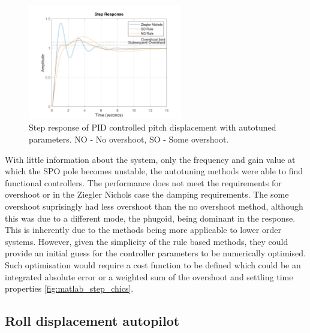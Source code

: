 \documentclass{article}
\begin{document}
\begin{figure}[H]
    \centering
    \includegraphics[width=0.6\textwidth]{figures/pitch_autopilot_autotuning_comparison.png}
    \caption{Step response of PID controlled pitch displacement with autotuned parameters. NO - No overshoot, SO - Some overshoot.}
    \label{fig:pitch_autopilot_autotune_step}
\end{figure}

With little information about the system, only the frequency and gain value at which the SPO pole becomes unstable, the autotuning methods were able to find functional controllers.
The performance does not meet the requirements for overshoot or in the Ziegler Nichols case the damping requirements.
The some overshoot suprisingly had less overshoot than the no overshoot method, although this was due to a different mode, the phugoid, being dominant in the response.
This is inherently due to the methods being more applicable to lower order systems.
However, given the simplicity of the rule based methods, they could provide an initial guess for the controller parameters to be numerically optimised.
Such optimisation would require a cost function to be defined which could be an integrated absolute error or a weighted sum of the overshoot and settling time properties \ref{fig:matlab_step_chics}.

\subsection{Roll displacement autopilot}
\end{document}
